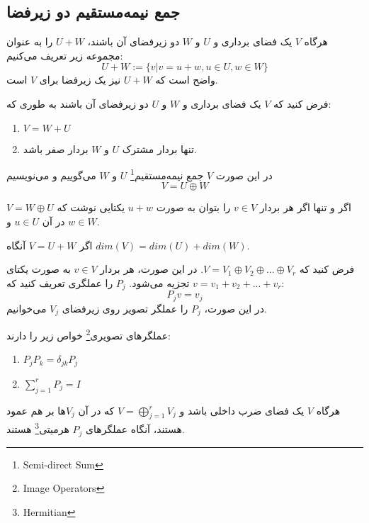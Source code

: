   \subsection{جمع نیمه‌مستقیم دو زیرفضا}
  
\begin{definition}
  هرگاه $V$ یک فضای برداری و $U$ و $W$ دو زیرفضای آن باشند، $U + W$ را به عنوان مجموعه زیر تعریف می‌کنیم:
  \begin{equation}
  	U + W := \{ v | v = u + w, u \in U, w \in W \}
  \end{equation}
   واضح است که $U + W$ نیز یک زیرفضا برای $V$ است. 
   \end{definition}
 \begin{definition}
   فرض کنید که $V$ یک فضای برداری و $W$ و $U$ دو زیرفضای آن باشند به طوری که:
   \begin{enumerate}
   \item $V = W + U$
   \item تنها بردار مشترک $U$ و $W$ بردار صفر باشد. 
   \end{enumerate}
   در این صورت $V$ جمع نیمه‌مستقیم\footnote{Semi-direct Sum} $U$ و $W$ می‌گوییم و می‌نویسیم 
   \begin{equation}
   V = U \oplus W
   \end{equation}
   \end{definition}
   \begin{theorem}
   $V = W \oplus U$ اگر و تنها اگر هر بردار $v \in V$ را بتوان به صورت $u + w$ یکتایی نوشت که در آن $u \in U$  و  $w \in W$. 
   \end{theorem}
   \begin{theorem}
   اگر $V = U + W$ آنگاه $dim(V) = dim(U) + dim(W)$. 
   \end{theorem}
   \begin{definition}
   فرض کنید که $V = V_{1} \oplus V_{2} \oplus ... \oplus V_{r}$. در این صورت، هر بردار $v \in V$ به صورت یکتای $v = v_{1} + v_{2} + ... + v_{r}$ تجزیه می‌شود. $P_{j}$ را عملگری تعریف کنید که:
   \begin{equation}
   		P_{j}v = v_{j}
   \end{equation}
   در این صورت، $P_{j}$ را عملگر تصویر روی زیرفضای  $V_{j}$ می‌خوانیم. 
   \end{definition}
   \begin{theorem}
   عملگرهای تصویری\footnote{Image Operators} خواص زیر را دارند:
   \begin{enumerate}
   	\item $P_{j}P_{k} = \delta_{jk}P_{j}$
   	\item $\sum_{j=1}^{r} P_{j} = I$
   \end{enumerate}
   \end{theorem}
   \begin{theorem}
   هرگاه $V$ یک فضای ضرب داخلی باشد و $V = \bigoplus_{j=1}^{r} V_{j}$ که در آن $V_{j}$ها بر هم عمود هستند، آنگاه عملگرهای $P_{j}$ هرمیتی\footnote{Hermitian} هستند. 
   \end{theorem}
